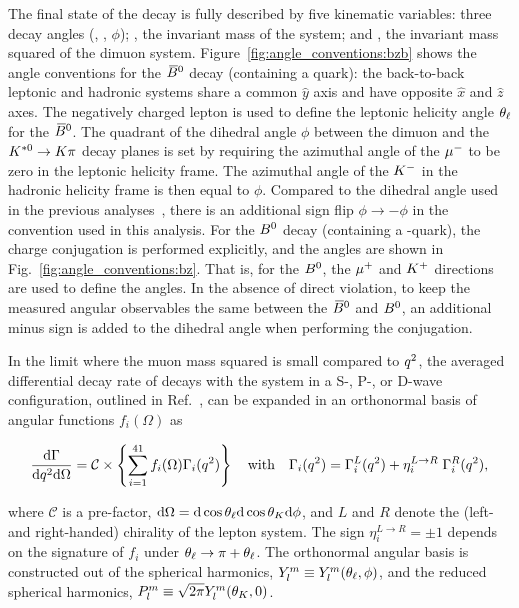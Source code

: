 The final state of the decay \BdToKpimm is fully described by five kinematic variables: three decay angles (\thetal, \thetak, $\phi$); \mkpi, the invariant mass of the \Kp\pim system; and \qsq, the invariant mass squared of the dimuon system. 
Figure~\ref{fig:angle_conventions:bzb} shows the angle conventions for the ${{\kern 0.18em\overline{\kern -0.18em B}{}}{}^0}$ decay (containing a \bquark quark): the back-to-back leptonic and hadronic systems share a common $\hat{y}$ axis and have opposite $\hat{x}$ and $\hat{z}$ axes. 
The negatively charged lepton is used to define the leptonic helicity angle $\theta_\ell$ for the ${{\kern 0.18em\overline{\kern -0.18em B}{}}{}^0}$.
The quadrant of the dihedral angle $\phi$ between the dimuon and the ${{K}^{*0}} \rightarrow K\pi$ decay planes is set by requiring the azimuthal angle of the ${\mu^-}$ to be zero in the leptonic helicity frame. The azimuthal angle of the ${{K}^-}$ in the hadronic helicity frame is then equal to $\phi$. Compared to the dihedral angle used in the previous \lhcb analyses~\cite{kstmm-0.3fb,kstmm-1fb,kstmm-1fb-pprime,kstmm-3fb}, there is an additional sign flip $\phi \to -\phi$ in the convention used in this analysis. For the ${{B}^0}$ decay (containing a \bquarkbar-quark), the charge conjugation is performed explicitly, and the angles are shown in Fig.~\ref{fig:angle_conventions:bz}. That is, for the ${{B}^0}$, the ${\mu^+}$ and ${{K}^+}$ directions are used to define the angles. In the absence of direct \CP violation, to keep the measured angular observables the same between the ${{\kern 0.18em\overline{\kern -0.18em B}{}}{}^0}$ and ${{B}^0}$, an additional minus sign is added to the dihedral angle when performing the \CP conjugation.

In the limit where the muon mass squared is small compared to ${q^2}$, the \CP averaged differential decay rate of \BdToKpimm decays with the \Kp\pim system in a S-, P-, or D-wave configuration, outlined in Ref.~\cite{biplab}, can be expanded in an orthonormal basis of angular functions $f_i(\Omega)$ as

\begin{equation}
\label{eqn:vector_moments}
\frac{\mathrm{d}\Gamma }{\mathrm{d}{q^2} \mathrm{d}\Omega} = \mathcal{C} \times \left\{ \displaystyle \sum^{41}_{i=1} f_i (\Omega) \Gamma_i({q^2}) \right\} 
 \quad\mbox{with}\quad
\Gamma_i({q^2}) = \Gamma^L_i({q^2}) + \eta^{L\rightarrow R}_i\; \Gamma^R_i({q^2}),
\end{equation}

\noindent where $\mathcal{C}$ is a pre-factor, $\mathrm{d}\Omega = \mathrm{d}\cos{\theta_\ell} \mathrm{d}\cos{\theta_K} \mathrm{d}\phi$, and $L$ and $R$ denote the (left- and right-handed) chirality of the lepton system. The sign $\eta^{L\to R}_i=\pm 1$ depends on the signature of $f_i$ under $\theta_\ell \rightarrow \pi + \theta_\ell$. 
\noindent The orthonormal angular basis is constructed out of the spherical harmonics, \mbox{$Y^m_l \equiv Y^m_l (\theta_\ell,\phi)$}, and the reduced spherical harmonics, \mbox{${P^m_l \equiv \sqrt{2 \pi}Y^m_l(\theta_K,0)}$}.
 
